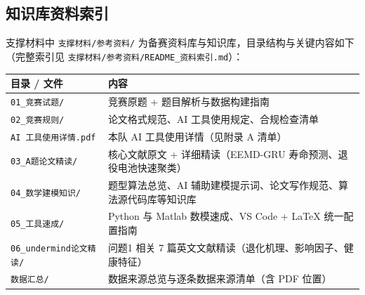 \documentclass[withoutpreface]{cumcmthesis}
\begin{document}
\begin{appendices}
\subsection{知识库资料索引}
支撑材料中 \texttt{支撑材料/参考资料/} 为备赛资料库与知识库，目录结构与关键内容如下（完整索引见 \texttt{支撑材料/参考资料/README\_资料索引.md}）：
\begin{table}[H]
\centering
\small
\begin{tabularx}{\textwidth}{LL}
\toprule
目录 / 文件 & 内容 \\
\midrule
\texttt{01\_竞赛试题/} & 竞赛原题 + 题目解析与数据构建指南 \\
\texttt{02\_竞赛规则/} & 论文格式规范、AI 工具使用规定、合规检查清单 \\
\texttt{AI 工具使用详情.pdf} & 本队 AI 工具使用详情（见附录 A 清单） \\
\texttt{03\_A题论文精读/} & 核心文献原文 + 详细精读（EEMD-GRU 寿命预测、退役电池快速聚类） \\
\texttt{04\_数学建模知识/} & 题型算法总览、AI 辅助建模提示词、论文写作规范、算法源代码库等知识库 \\
\texttt{05\_工具速成/} & Python 与 Matlab 数模速成、VS Code + LaTeX 统一配置指南 \\
\texttt{06\_undermind论文精读/} & 问题1 相关 7 篇英文文献精读（退化机理、影响因子、健康特征） \\
\texttt{数据汇总/} & 数据来源总览与逐条数据来源清单（含 PDF 位置） \\
\bottomrule
\end{tabularx}
\end{table}

\end{appendices}
\end{document}
